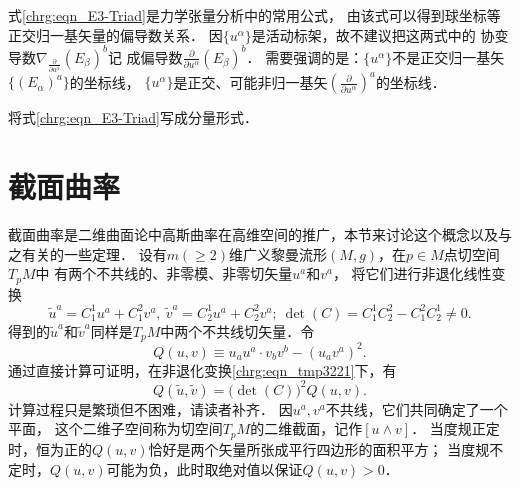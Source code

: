 式\eqref{chrg:eqn_E3-Triad}是力学张量分析中的常用公式，
由该式可以得到球坐标等正交归一基矢量的偏导数关系．
因$\{u^\alpha\}$是活动标架，故不建议把这两式中的
协变导数$\nabla _{\frac{\partial }{\partial u^\alpha}} (E_\beta)^b$记
成偏导数$\frac{\partial }{\partial u^\alpha} (E_\beta)^b$．
需要强调的是：$\{u^\alpha\}$不是正交归一基矢$\{(E_\alpha)^a\}$的坐标线，
$\{u^\alpha\}$是正交、可能非归一基矢$(\frac{\partial }{\partial u^\alpha})^a$的坐标线．




\begin{exercise}
	将式\eqref{chrg:eqn_E3-Triad}写成分量形式．
\end{exercise}



\section{截面曲率}\label{chrg:sec_sectional-curvature}
截面曲率是二维曲面论中高斯曲率在高维空间的推广，本节来讨论这个概念以及与之有关的一些定理．
设有$m(\geqslant 2)$维广义黎曼流形$(M,g)$，在$p\in M$点切空间$T_pM$中
有两个不共线的、非零模、非零切矢量$u^a$和$v^a$，
将它们进行非退化线性变换
\begin{equation}\label{chrg:eqn_tmp3221}
    \tilde{u}^a = C_1^1 u^a +C_1^2 v^a, \ \tilde{v}^a = C_2^1 u^a +C_2^2 v^a;
    \ \det(C) = C_1^1C_2^2 - C_1^2 C^1_2\neq 0 .
\end{equation}
得到的$\tilde{u}^a$和$\tilde{v}^a$同样是$T_pM$中两个不共线切矢量．令
\begin{equation}\label{chrg:eqn_tmp3222}
    Q(u,v)\equiv {u}_a{u}^a \cdot {v}_b{v}^b - ({u}_a{v}^a)^2 .
\end{equation}
通过直接计算可证明，在非退化变换\eqref{chrg:eqn_tmp3221}下，有
\begin{equation}\label{chrg:eqn_tmp3223}
    Q(\tilde{u},\tilde{v}) = \bigl(\det(C)\bigr)^2 Q(u,v) .
\end{equation}
计算过程只是繁琐但不困难，请读者补齐．
因$u^a,v^a$不共线，它们共同确定了一个平面，
这个二维子空间称为切空间$T_pM$的{\heiti 二维截面}，记作$[u\wedge v]$．
当度规正定时，恒为正的$Q(u,v)$恰好是两个矢量所张成平行四边形的面积平方；
当度规不定时，$Q(u,v)$可能为负，此时取绝对值以保证$Q(u,v)>0$．

